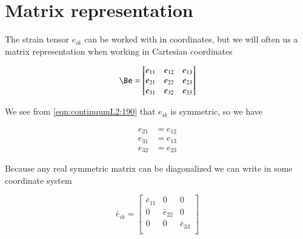 % 
% 
% 
% 
% 
% 
% 
% 
% 
% 
% 
% 


\section{Matrix representation}

The strain tensor $e_{ik}$ can be worked with in coordinates, but we will often us a matrix representation when working in Cartesian coordinates 

\begin{equation}\label{eqn:continuumL2:210}
\Be = 
\begin{bmatrix}
e_{11} & e_{12} & e_{13} \\
e_{21} & e_{22} & e_{23} \\
e_{31} & e_{32} & e_{33} \\
\end{bmatrix}
\end{equation}

We see from \ref{eqn:continuumL2:190} that $e_{ik}$ is symmetric, so we have

\begin{align}\label{eqn:continuumL2:230}
e_{21} &= e_{12} \\
e_{31} &= e_{13} \\
e_{32} &= e_{23}
\end{align}

Because any real symmetric matrix can be diagonalized we can write in some coordinate system

\begin{equation}\label{eqn:continuumL2:250}
\bar{e}_{ik} =
\begin{bmatrix}
\bar{e}_{11} & 0 & 0 \\
0 & \bar{e}_{22} & 0 \\
0 & 0 & \bar{e}_{33} \\
\end{bmatrix}
\end{equation}

